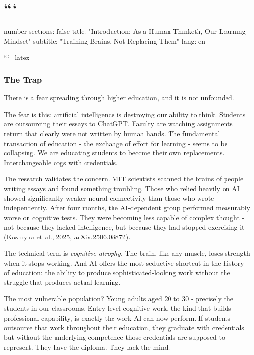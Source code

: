 \documentclass[
  letterpaper,
  DIV=11,
  numbers=noendperiod]{scrreprt}
\begin{document}
\vspace*{\fill}
\newpage


\chapter{```}\label{section}

\mainmatter
number-sections: false
title: "Introduction: As a Human Thinketh, Our Learning Mindset"
subtitle: "Training Brains, Not Replacing Them"
lang: en
---

```{=latex}
\mainmatter

\subsection{The Trap}\label{the-trap}

There is a fear spreading through higher education, and it is not
unfounded.

The fear is this: artificial intelligence is destroying our ability to
think. Students are outsourcing their essays to ChatGPT. Faculty are
watching assignments return that clearly were not written by human
hands. The fundamental transaction of education - the exchange of effort
for learning - seems to be collapsing. We are educating students to
become their own replacements. Interchangeable cogs with credentials.

The research validates the concern. MIT scientists scanned the brains of
people writing essays and found something troubling. Those who relied
heavily on AI showed significantly weaker neural connectivity than those
who wrote independently. After four months, the AI-dependent group
performed measurably worse on cognitive tests. They were becoming less
capable of complex thought - not because they lacked intelligence, but
because they had stopped exercising it (Kosmyna et al., 2025,
arXiv:2506.08872).

The technical term is \emph{cognitive atrophy}. The brain, like any
muscle, loses strength when it stops working. And AI offers the most
seductive shortcut in the history of education: the ability to produce
sophisticated-looking work without the struggle that produces actual
learning.

The most vulnerable population? Young adults aged 20 to 30 - precisely
the students in our classrooms. Entry-level cognitive work, the kind
that builds professional capability, is exactly the work AI can now
perform. If students outsource that work throughout their education,
they graduate with credentials but without the underlying competence
those credentials are supposed to represent. They have the diploma. They
lack the mind.
\end{document}
